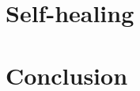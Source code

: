 \documentclass{report}
\begin{document}
\chapter{Self-healing}


\chapter{Conclusion}




\clearpage
{}


\nocite{Hamalainen2009} %
\nocite{Jamalipour2008} %
\nocite{Kakadia2017} %
\nocite{Sartori2012} %
\end{document}
